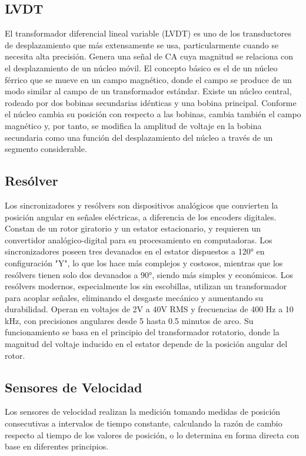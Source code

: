 \subsection*{\quad\textbf{LVDT}}
El transformador diferencial lineal variable (LVDT) es uno de los transductores de desplazamiento que más extensamente se usa, particularmente cuando se necesita alta precisión. Genera una señal de CA cuya magnitud se relaciona con el desplazamiento de un núcleo móvil. El concepto básico es el de un núcleo férrico que se mueve en un campo magnético, donde el campo se produce de un modo similar al campo de un transformador estándar. Existe un núcleo central, rodeado por dos bobinas secundarias idénticas y una bobina principal. Conforme el núcleo cambia su posición con respecto a las bobinas, cambia también el campo magnético y, por tanto, se modifica la amplitud de voltaje en la bobina secundaria como una función del desplazamiento del núcleo a través de un segmento considerable.

\subsection*{\quad\textbf{Resólver}}
Los sincronizadores y resólvers son dispositivos analógicos que convierten la posición angular en señales eléctricas, a diferencia de los encoders digitales. Constan de un rotor giratorio y un estator estacionario, y requieren un convertidor analógico-digital para su procesamiento en computadoras. Los sincronizadores poseen tres devanados en el estator dispuestos a 120° en configuración "Y", lo que los hace más complejos y costosos, mientras que los resólvers tienen solo dos devanados a 90°, siendo más simples y económicos. Los resólvers modernos, especialmente los sin escobillas, utilizan un transformador para acoplar señales, eliminando el desgaste mecánico y aumentando su durabilidad. Operan en voltajes de 2V a 40V RMS y frecuencias de 400 Hz a 10 kHz, con precisiones angulares desde 5 hasta 0.5 minutos de arco. Su funcionamiento se basa en el principio del transformador rotatorio, donde la magnitud del voltaje inducido en el estator depende de la posición angular del rotor.


\subsection{\textbf{Sensores de Velocidad}}
Los sensores de velocidad realizan la medición tomando medidas de posición consecutivas a intervalos de tiempo constante, calculando la razón de cambio respecto al tiempo de los valores de posición, o lo determina en forma directa con base en diferentes principios.

